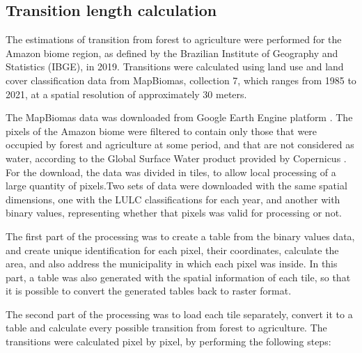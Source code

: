 \documentclass[essd, manuscript]{copernicus}
\begin{document}
\subsection{Transition length calculation}

The estimations of transition from forest to agriculture were performed for the Amazon biome region, as defined by the Brazilian Institute of Geography and Statistics (IBGE), in 2019.
Transitions were calculated using land use and land cover classification data from MapBiomas, collection 7, which ranges from 1985 to 2021, at a spatial resolution of approximately 30 meters.

The MapBiomas data was downloaded from Google Earth Engine platform \citep{Gorelick2017}.
The pixels of the Amazon biome were filtered to contain only those that were occupied by forest and agriculture at some period, and that are not considered as water, according to the Global Surface Water product provided by Copernicus \citep{Pekel2016}.
For the download, the data was divided in tiles, to allow local processing of a large quantity of pixels.Two sets of data were downloaded with the same spatial dimensions, one with the LULC classifications for each year, and another with binary values, representing whether that pixels was valid for processing or not.

The first part of the processing was to create a table from the binary values data, and create unique identification for each pixel, their coordinates, calculate the area, and also address the municipality in which each pixel was inside.
In this part, a table was also generated with the spatial information of each tile, so that it is possible to convert the generated tables back to raster format.

The second part of the processing was to load each tile separately, convert it to a table and calculate every possible transition from forest to agriculture.
The transitions were calculated pixel by pixel, by performing the following steps:
\end{document}
